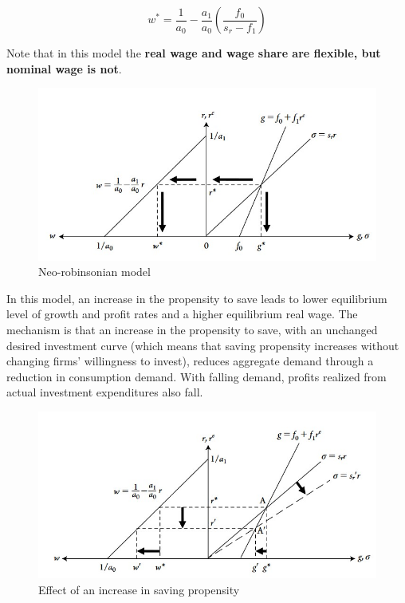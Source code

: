 \documentclass[
  letterpaper,
  DIV=11,
  numbers=noendperiod]{scrreprt}
\begin{document}
\[w^* = \frac{1}{a_0} - \frac{a_1}{a_0}(\frac{f_0}{s_r-f_1})\]

Note that in this model the \textbf{real wage and wage share are
flexible, but nominal wage is not}.

\begin{figure}

{\centering \includegraphics[width=5.32292in,height=\textheight]{images/neorobinson.jpg}

}

\caption{Neo-robinsonian model}

\end{figure}

In this model, an increase in the propensity to save leads to lower
equilibrium level of growth and profit rates and a higher equilibrium
real wage. The mechanism is that an increase in the propensity to save,
with an unchanged desired investment curve (which means that saving
propensity increases without changing firms' willingness to invest),
reduces aggregate demand through a reduction in consumption demand. With
falling demand, profits realized from actual investment expenditures
also fall.

\begin{figure}

{\centering \includegraphics[width=5.32292in,height=\textheight]{images/neorobinson2.jpg}

}

\caption{Effect of an increase in saving propensity}

\end{figure}
\end{document}
